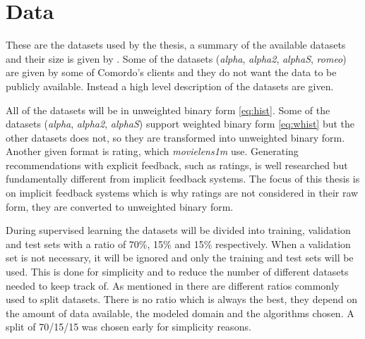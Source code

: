 
\section{Data}\label{sec:datasets}

These are the datasets used by the thesis, a summary of the available datasets and their size is given by . Some of the datasets (\textit{alpha}, \textit{alpha2}, \textit{alphaS}, \textit{romeo}) are given by some of Comordo's clients and they do not want the data to be publicly available. Instead a high level description of the datasets are given.

All of the datasets will be in unweighted binary form \eqref{eq:hist}. Some of the datasets (\textit{alpha}, \textit{alpha2}, \textit{alphaS}) support weighted binary form \eqref{eq:whist} but the other datasets does not, so they are transformed into unweighted binary form. Another given format is rating, which \textit{movielens1m} use. Generating recommendations with explicit feedback, such as ratings, is well researched but fundamentally different from implicit feedback systems. The focus of this thesis is on implicit feedback systems which is why ratings are not considered in their raw form, they are converted to unweighted binary form.

During supervised learning the datasets will be divided into training, validation and test sets with a ratio of 70\%, 15\% and 15\% respectively. When a validation set is not necessary, it will be ignored and only the training and test sets will be used. This is done for simplicity and to reduce the number of different datasets needed to keep track of.  As mentioned in  there are different ratios commonly used to split datasets. There is no ratio which is always the best, they depend on the amount of data available, the modeled domain and the algorithms chosen. A split of 70/15/15 was chosen early for simplicity reasons.

